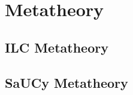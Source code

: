 \section{Metatheory}
\label{sec:metatheory}

\subsection{ILC Metatheory}
\label{subsec:ilc-meta}

\begin{theorem}[Progress]

\end{theorem}

\begin{theorem}[Preservation]

\end{theorem}

\begin{theorem}[Confluence]

\end{theorem}

\subsection{SaUCy Metatheory}
\label{subsec:uc-meta}

\begin{theorem}

\end{theorem}
